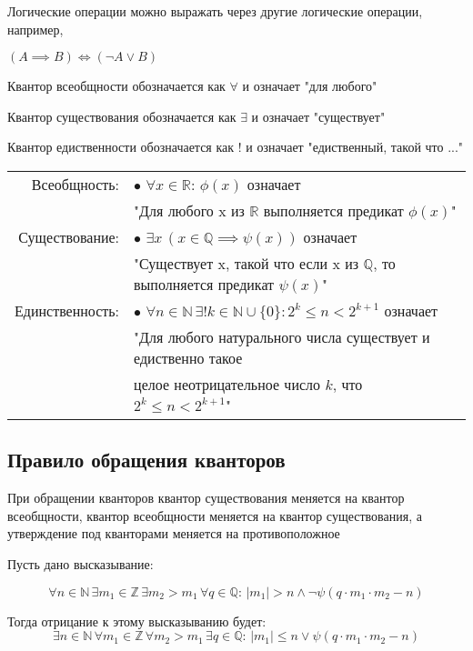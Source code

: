 \nt
{
    Логические операции можно выражать через другие логические операции, например,

    $ (A \implies B) \iff (\lnot A \vee B) $
}

{
Квантор всеобщности обозначается как $ \forall $ и означает "для любого"

Квантор существования обозначается как $ \exists $ и означает "существует"

Квантор едиственности обозначается как $ ! $ и означает "едиственный, такой что ..."
}

\mcex{}
{
\begin{tabular}{rl}
    Всеобщность:    & $\bullet$ $ \forall x \in \mathbb{R}: \, \phi(x) $ означает \\
                    & "Для любого x из $\mathbb{R} $ выполняется предикат $ \phi(x) $" \\
    Существование:  & $\bullet$ $ \exists x \, (x \in \mathbb{Q} \implies \psi(x)) $ означает \\
                    & "Существует x, такой что если x из $\mathbb{Q} $, то выполняется предикат $ \psi(x) $" \\
    Единственность: & $\bullet$ $ \forall n \in \mathbb{N} \, \exists! k \in \mathbb{N} \cup \{ 0 \}: 2^k \le n < 2^{k + 1} $ означает \\
                    & "Для любого натурального числа существует и едиственно такое \\
                    & целое неотрицательное число $ k $, что $ 2^k \le n < 2^{k + 1} $" \\
\end{tabular}
}



\subsection{Правило обращения кванторов}

{
    При обращении кванторов квантор существования
    меняется на квантор всеобщности, квантор всеобщности
    меняется на квантор существования, а утверждение под
    кванторами меняется на противоположное
}

\mcex{}
{
    Пусть дано высказывание:

    \[
    \forall n \in \mathbb{N} \,
    \exists m_1 \in \mathbb{Z} \,
    \exists m_2 > m_1 \,
    \forall q \in \mathbb{Q}: \,
        | m_1 | > n \wedge \lnot
        \psi(q \cdot m_1 \cdot m_2 - n)
    \]

    Тогда отрицание к этому высказыванию будет:
    \[
    \exists n \in \mathbb{N} \,
    \forall m_1 \in \mathbb{Z} \,
    \forall m_2 > m_1 \,
    \exists q \in \mathbb{Q}: \,
        | m_1 | \le n \vee
        \psi(q \cdot m_1 \cdot m_2 - n)
    \]
}

